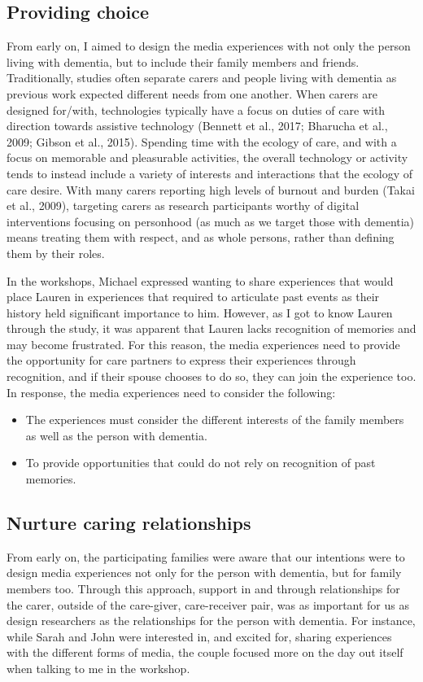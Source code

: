 \subsection{Providing choice}
\label{DR:ProvidingChoice}
From early on, I aimed to design the media experiences with not only the person living with dementia, but to include their family members and friends. Traditionally, studies often separate carers and people living with dementia as previous work expected different needs from one another. When carers are designed for/with, technologies typically have a focus on duties of care with direction towards assistive technology (Bennett et al., 2017; Bharucha et al., 2009; Gibson et al., 2015). Spending time with the ecology of care, and with a focus on memorable and pleasurable activities, the overall technology or activity tends to instead include a variety of interests and interactions that the ecology of care desire. With many carers reporting high levels of burnout and burden (Takai et al., 2009), targeting carers as research participants worthy of digital interventions focusing on personhood (as much as we target those with dementia) means treating them with respect, and as whole persons, rather than defining them by their roles.

In the workshops, Michael expressed wanting to share experiences that would place Lauren in experiences that required to articulate past events as their history held significant importance to him. However, as I got to know Lauren through the study, it was apparent that Lauren lacks recognition of memories and may become frustrated. For this reason, the media experiences need to provide the opportunity for care partners to express their experiences through recognition, and if their spouse chooses to do so, they can join the experience too. In response, the media experiences need to consider the following:
\begin{itemize}
    \item The experiences must consider the different interests of the family members as well as the person with dementia. 
    \item To provide opportunities that could do not rely on recognition of past memories.
\end{itemize}

\subsection{Nurture caring relationships}
\label{CaringRelationships}
From early on, the participating families were aware that our intentions were to design media experiences not only for the person with dementia, but for family members too. Through this approach, support in and through relationships for the carer, outside of the care-giver, care-receiver pair, was as important for us as design researchers as the relationships for the person with dementia. For instance, while Sarah and John were interested in, and excited for, sharing experiences with the different forms of media, the couple focused more on the day out itself when talking to me in the workshop. 

